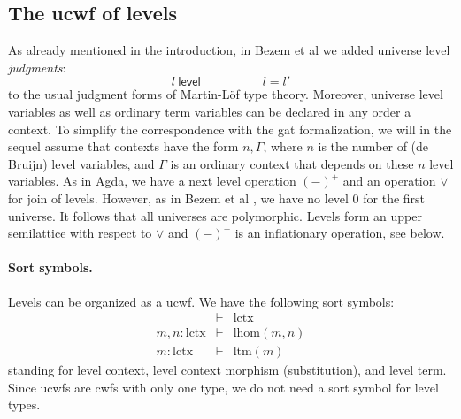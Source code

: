 \documentclass[11pt,a4paper]{article}
\theoremstyle{plain}
\theoremstyle{definition}
\newcommand{\level}{\mathsf{level}}
\def\lHom{\mathrm{lhom}}
\def\lctx{\mathrm{lctx}}
\def\ltm{\mathrm{ltm}}
\begin{document}
\subsection{The ucwf of levels}\label{ucwf-levels}
 As already mentioned in the introduction, in Bezem et al \cite{BezemCDE22} we added universe level {\em judgments}:
$$
l\ \level
\hspace{5em}
l = l'
$$
to the usual judgment forms of Martin-Löf type theory. Moreover, universe level variables as well as ordinary term variables can be declared in any order a context. To simplify the correspondence with the gat formalization, we will in the sequel assume that contexts have the form $n, \Gamma$, where $n$ is the number of (de Bruijn) level variables, and $\Gamma$ is an ordinary context that depends on these $n$ level variables.
As in Agda, we have a next level operation $(-)^+$ and an operation $\vee$ for join of levels. However, as in Bezem et al \cite{BezemCDE22}, we have no level 0 for the first universe. It follows that all universes are polymorphic.
Levels form an upper semilattice with respect to $\vee$ and $(-)^+$ is an inflationary operation, see below.

\paragraph{Sort symbols.} Levels can be organized as a ucwf. We have the following sort symbols:
\begin{eqnarray*}
&\vdash& \lctx\\
m, n : \lctx &\vdash& \lHom(m,n)\\
m : \lctx &\vdash& \ltm(m)
\end{eqnarray*}
standing for level context, level context morphism (substitution), and level term.
Since ucwfs are cwfs with only one type, we do not need a sort symbol for level types.
\end{document}
